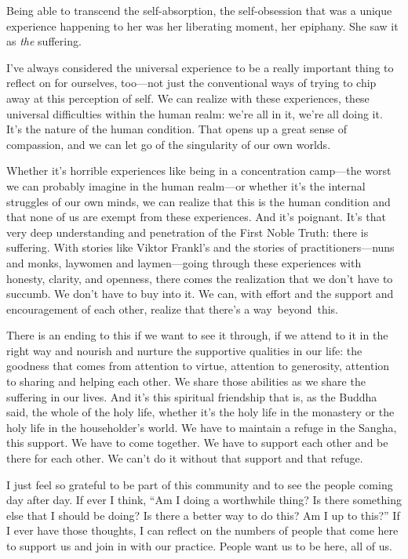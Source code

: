 Being able to transcend the self-absorption, the self-obsession that was a unique experience happening to her was her liberating moment, her epiphany. She saw it as \emph{the} suffering.

I've always considered the universal experience to be a really important thing to reflect on for ourselves, too---not just the conventional ways of trying to chip away at this perception of self. We can realize with these experiences, these universal difficulties within the human realm: we're all in it, we're all doing it. It's the nature of the human condition. That opens up a great sense of compassion, and we can let go of the singularity of our own worlds.

Whether it's horrible experiences like being in a concentration camp---the worst we can probably imagine in the human realm---or whether it's the internal struggles of our own minds, we can realize that this is the human condition and that none of us are exempt from these experiences. And it's poignant. It's that very deep understanding and penetration of the First Noble Truth: there is suffering. With stories like Viktor Frankl's and the stories of practitioners---nuns and monks, laywomen and laymen---going through these experiences with honesty, clarity, and openness, there comes the realization that we don't have to succumb. We don't have to buy into it. We can, with effort and the support and encouragement of each other, realize that there's a \mbox{way beyond this.}

There is an ending to this if we want to see it through, if we attend to it in the right way and nourish and nurture the supportive qualities in our life: the goodness that comes from attention to virtue, attention to generosity, attention to sharing and helping each other. We share those abilities as we share the suffering in our lives. And it's this spiritual friendship that is, as the Buddha said, the whole of the holy life, whether it's the holy life in the monastery or the holy life in the householder's world. We have to maintain a refuge in the Sangha, this support. We have to come together. We have to support each other and be there for each other. We can't do it without that support and that refuge.

I just feel so grateful to be part of this community and to see the people coming day after day. If ever I think, ``Am I doing a worthwhile thing? Is there something else that I should be doing? Is there a better way to do this? Am I up to this?'' If I ever have those thoughts, I can reflect on the numbers of people that come here to support us and join in with our practice. People want us to be here, all of us.

